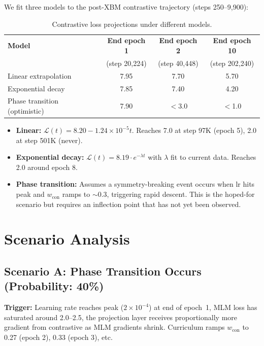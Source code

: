 \documentclass[11pt,a4paper]{article}
\newcommand{\loss}{\mathcal{L}}
\begin{document}
We fit three models to the post-XBM contrastive trajectory (steps 250--9{,}900):

\begin{table}[H]
\centering
\caption{Contrastive loss projections under different models.}
\label{tab:projections}
\begin{tabular}{@{}lccc@{}}
\toprule
\textbf{Model} & \textbf{End epoch 1} & \textbf{End epoch 2} & \textbf{End epoch 10} \\
 & (step 20{,}224) & (step 40{,}448) & (step 202{,}240) \\
\midrule
Linear extrapolation & 7.95 & 7.70 & 5.70 \\
Exponential decay & 7.85 & 7.40 & 4.20 \\
Phase transition (optimistic) & 7.90 & $<$3.0 & $<$1.0 \\
\bottomrule
\end{tabular}
\end{table}

\begin{itemize}[nosep]
  \item \textbf{Linear:} $\loss(t) = 8.20 - 1.24 \times 10^{-5} t$.
        Reaches 7.0 at step 97K (epoch 5), 2.0 at step 501K (never).
  \item \textbf{Exponential decay:} $\loss(t) = 8.19 \cdot e^{-\lambda t}$ with
        $\lambda$ fit to current data. Reaches 2.0 around epoch 8.
  \item \textbf{Phase transition:} Assumes a symmetry-breaking event occurs when
        lr hits peak and $w_{\text{con}}$ ramps to $\sim$0.3, triggering rapid descent.
        This is the hoped-for scenario but requires an inflection point that has not
        yet been observed.
\end{itemize}


\section{Scenario Analysis}

\subsection{Scenario A: Phase Transition Occurs (Probability: 40\%)}

\textbf{Trigger:} Learning rate reaches peak ($2 \times 10^{-4}$) at end of epoch~1,
MLM loss has saturated around 2.0--2.5, the projection layer receives proportionally
more gradient from contrastive as MLM gradients shrink. Curriculum ramps $w_{\text{con}}$
to 0.27 (epoch 2), 0.33 (epoch 3), etc.
\end{document}
